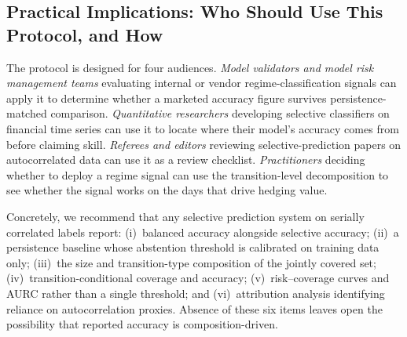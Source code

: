 \documentclass[12pt]{article}
\begin{document}
\subsection*{Practical Implications: Who Should Use This Protocol, and How}
\label{sec:practical}

The protocol is designed for four audiences. \emph{Model validators and model risk management
teams} evaluating internal or vendor regime-classification signals can apply it to determine
whether a marketed accuracy figure survives persistence-matched comparison. \emph{Quantitative
researchers} developing selective classifiers on financial time series can use it to locate
where their model's accuracy comes from before claiming skill. \emph{Referees and editors}
reviewing selective-prediction papers on autocorrelated data can use it as a review checklist.
\emph{Practitioners} deciding whether to deploy a regime signal can use the transition-level
decomposition to see whether the signal works on the days that drive hedging value.

Concretely, we recommend that any selective prediction system on serially correlated labels
report: (i)~balanced accuracy alongside selective accuracy; (ii)~a persistence baseline whose
abstention threshold is calibrated on training data only; (iii)~the size and transition-type
composition of the jointly covered set; (iv)~transition-conditional coverage and accuracy;
(v)~risk--coverage curves and AURC rather than a single threshold; and (vi)~attribution
analysis identifying reliance on autocorrelation proxies. Absence of these six items leaves
open the possibility that reported accuracy is composition-driven.
\end{document}
